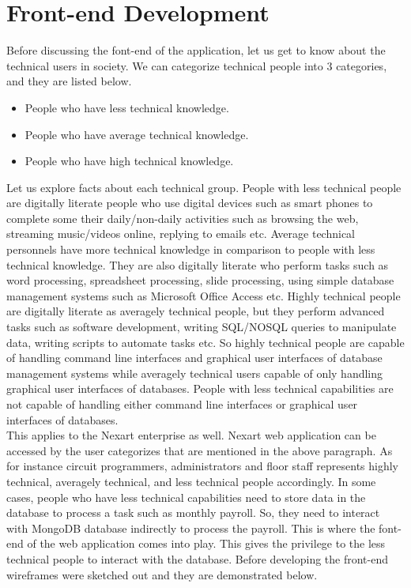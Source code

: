 \documentclass[a4Paper,12pt]{report}
\begin{document}
\section{Front-end Development}
Before discussing the font-end of the application, let us get to know about the technical users in society. We can categorize technical people into 3 categories, and they are listed below.
\begin{itemize}
\item People who have less technical knowledge.
\item People who have average technical knowledge.
\item People who have high technical knowledge.
\end{itemize}
Let us explore facts about each technical group. People with less technical people are digitally literate people who use digital devices such as smart phones to complete some their daily/non-daily activities such as browsing the web, streaming music/videos online, replying to emails etc. Average technical personnels have more technical knowledge in comparison to people with less technical knowledge. They are also digitally literate who perform tasks such as word processing, spreadsheet processing, slide processing, using simple database management systems such as Microsoft Office Access etc. Highly technical people are digitally literate as averagely technical people, but they perform advanced tasks such as software development, writing SQL/NOSQL queries to manipulate data, writing scripts to automate tasks etc. So highly technical people are capable of handling command line interfaces and graphical user interfaces of database management systems while averagely technical users capable of only handling graphical user interfaces of databases. People with less technical capabilities are not capable of handling either command line interfaces or graphical user interfaces of databases.\\[12pt]
This applies to the Nexart enterprise as well. Nexart web application can be accessed by the user categorizes that are mentioned in the above paragraph. As for instance circuit programmers, administrators and floor staff represents highly technical, averagely technical, and less technical people accordingly. In some cases, people who have less technical capabilities need to store data in the database to process a task such as monthly payroll. So, they need to interact with MongoDB database indirectly to process the payroll. This is where the font-end of the web application comes into play. This gives the privilege to the less technical people to interact with the database. Before developing the front-end wireframes were sketched out and they are demonstrated below.
\end{document}
